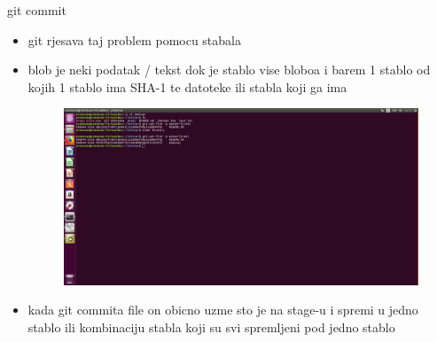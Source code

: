 \documentclass[]{beamer}
\begin{document}
\begin{frame}{git commit}

\begin{itemize}
	\item git rjesava taj problem pomocu stabala
	\item blob je neki podatak / tekst dok je stablo vise bloboa i barem 1 stablo od kojih 1 stablo ima SHA-1 te datoteke ili stabla koji ga ima
	\begin{figure}
		\centering
	\includegraphics[scale=.48]{./slike/treca_slika.png}
	\end{figure}
	\item kada git commita file on obicno uzme sto je na stage-u i spremi u jedno stablo ili kombinaciju stabla koji su svi spremljeni pod jedno stablo
\end{itemize}
\end{frame}
\end{document}
